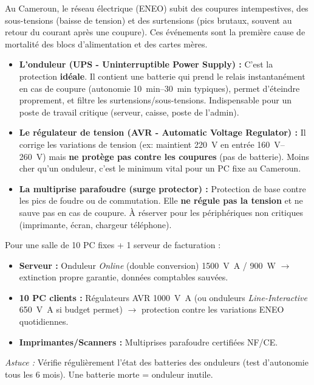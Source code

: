 \documentclass[11pt]{article}
\newcommand{\cle}[1]{{\popxbold\color{popdark}#1}}
\begin{document}
Au Cameroun, le réseau électrique (ENEO) subit des \cle{coupures intempestives}, des \cle{sous-tensions} (baisse de tension) et des \cle{surtensions} (pics brutaux, souvent au retour du courant après une coupure). Ces événements sont la première cause de mortalité des blocs d'alimentation et des cartes mères.

\begin{propriete}
\begin{itemize}
    \item \textbf{L'onduleur (UPS - Uninterruptible Power Supply) :} C'est la protection \textbf{idéale}. Il contient une batterie qui prend le relais instantanément en cas de coupure (autonomie \SIrange{10}{30}{\minute} typiques), permet d'éteindre proprement, et filtre les surtensions/sous-tensions. Indispensable pour un poste de travail critique (serveur, caisse, poste de l'admin).
    \item \textbf{Le régulateur de tension (AVR - Automatic Voltage Regulator) :} Il corrige les variations de tension (ex: maintient \SI{220}{\volt} en entrée \SIrange{160}{260}{\volt}) mais \textbf{ne protège pas contre les coupures} (pas de batterie). Moins cher qu'un onduleur, c'est le minimum vital pour un PC fixe au Cameroun.
    \item \textbf{La multiprise parafoudre (surge protector) :} Protection de base contre les pics de foudre ou de commutation. Elle \textbf{ne régule pas la tension} et ne sauve pas en cas de coupure. À réserver pour les périphériques non critiques (imprimante, écran, chargeur téléphone).
\end{itemize}
\end{propriete}

\begin{exemplebox}
Pour une salle de 10 PC fixes + 1 serveur de facturation :
\begin{itemize}
    \item \textbf{Serveur :} Onduleur \textit{Online} (double conversion) \SI{1500}{\volt\ampere} / \SI{900}{\watt} $\rightarrow$ extinction propre garantie, données comptables sauvées.
    \item \textbf{10 PC clients :} Régulateurs AVR \SI{1000}{\volt\ampere} (ou onduleurs \textit{Line-Interactive} \SI{650}{\volt\ampere} si budget permet) $\rightarrow$ protection contre les variations ENEO quotidiennes.
    \item \textbf{Imprimantes/Scanners :} Multiprises parafoudre certifiées NF/CE.
\end{itemize}
\textit{Astuce :} Vérifie régulièrement l'état des batteries des onduleurs (test d'autonomie tous les 6 mois). Une batterie morte = onduleur inutile.
\end{exemplebox}
\end{document}

